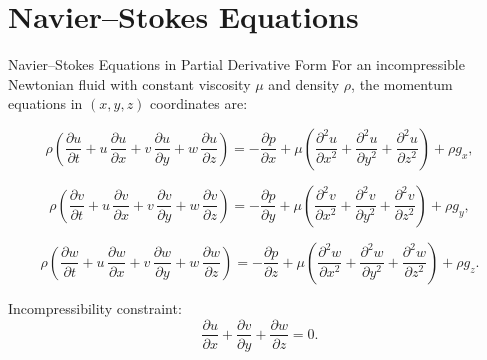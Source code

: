 \documentclass[aspectratio=169]{beamer}
\begin{document}
\section{Navier--Stokes Equations}

\begin{frame}{Navier--Stokes Equations in Partial Derivative Form}
\footnotesize
For an incompressible Newtonian fluid with constant viscosity $\mu$ and density $\rho$,
the momentum equations in $(x,y,z)$ coordinates are:

\[
\rho \left(
\frac{\partial u}{\partial t}
+ u\,\frac{\partial u}{\partial x}
+ v\,\frac{\partial u}{\partial y}
+ w\,\frac{\partial u}{\partial z}
\right)
=
-\frac{\partial p}{\partial x}
+ \mu\left(
\frac{\partial^2 u}{\partial x^2}
+ \frac{\partial^2 u}{\partial y^2}
+ \frac{\partial^2 u}{\partial z^2}
\right)
+ \rho g_x,
\]

\[
\rho \left(
\frac{\partial v}{\partial t}
+ u\,\frac{\partial v}{\partial x}
+ v\,\frac{\partial v}{\partial y}
+ w\,\frac{\partial v}{\partial z}
\right)
=
-\frac{\partial p}{\partial y}
+ \mu\left(
\frac{\partial^2 v}{\partial x^2}
+ \frac{\partial^2 v}{\partial y^2}
+ \frac{\partial^2 v}{\partial z^2}
\right)
+ \rho g_y,
\]

\[
\rho \left(
\frac{\partial w}{\partial t}
+ u\,\frac{\partial w}{\partial x}
+ v\,\frac{\partial w}{\partial y}
+ w\,\frac{\partial w}{\partial z}
\right)
=
-\frac{\partial p}{\partial z}
+ \mu\left(
\frac{\partial^2 w}{\partial x^2}
+ \frac{\partial^2 w}{\partial y^2}
+ \frac{\partial^2 w}{\partial z^2}
\right)
+ \rho g_z.
\]

\medskip

Incompressibility constraint:
\[
\frac{\partial u}{\partial x}
+ \frac{\partial v}{\partial y}
+ \frac{\partial w}{\partial z}
= 0.
\]

\end{frame}
\end{document}
